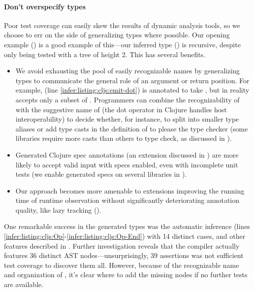 \paragraph{Don't overspecify types}
Poor test coverage can easily skew the results of dynamic analysis tools,
so we choose to err on the side of generalizing types
where possible.
Our opening example  ()
is a good example of this---our inferred type ()
is recursive, despite  only being tested with a tree of height 2.
This has several benefits.
\begin{itemize}
  \item We avoid exhausting the pool of easily recognizable names
    by generalizing types to communicate the general role
    of an argument or return position.
    For example,  (line \ref{infer:listing:cljs:emit-dot})
    is annotated to take , but in reality accepts only a subset
    of .
    Programmers can combine the recognizability of  with the
    suggestive name of  (the dot operator in Clojure handles host interoperability) to decide whether, for instance,
    to split  into smaller type aliases
    or add type casts in the definition of  to please 
    the type checker
    (some libraries require more casts than others to type check, as discussed in ).
  \item Generated Clojure spec annotations (an extension discussed in )
        are more likely to accept valid input with specs enabled, even with incomplete unit tests
        (we enable generated specs on several libraries in ).
  \item Our approach becomes more amenable to extensions improving the running time
        of runtime observation without significantly deteriorating annotation quality,
        like lazy tracking ().
\end{itemize}

One remarkable success in the generated types
was the automatic inference  (lines \ref{infer:listing:cljs:Op}-\ref{infer:listing:cljs:Op-End})
with 14 distinct cases, and other features described in .
Further investigation reveals that
the compiler actually features 36 distinct AST nodes---unsurprisingly, 39 assertions was not sufficient
test coverage to discover them all.
However, because of the recognizable name and organization of
, it's clear where to add the missing nodes
if no further tests are available.

